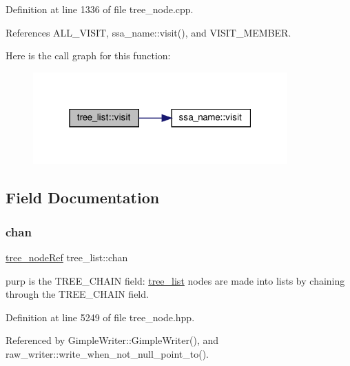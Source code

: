 Definition at line 1336 of file tree\+\_\+node.\+cpp.



References A\+L\+L\+\_\+\+V\+I\+S\+IT, ssa\+\_\+name\+::visit(), and V\+I\+S\+I\+T\+\_\+\+M\+E\+M\+B\+ER.

Here is the call graph for this function\+:
\nopagebreak
\begin{figure}[H]
\begin{center}
\leavevmode
\includegraphics[width=277pt]{d0/de6/structtree__list_aba63a94a601053b16420e7f757237b5d_cgraph}
\end{center}
\end{figure}


\subsection{Field Documentation}
\mbox{\label{structtree__list_aa5ce539dab8623b7ff811a2fbd1f0f25}} 
\subsubsection{\texorpdfstring{chan}{chan}}
{\footnotesize\ttfamily \hyperlink{tree__node_8hpp_a6ee377554d1c4871ad66a337eaa67fd5}{tree\+\_\+node\+Ref} tree\+\_\+list\+::chan}



purp is the T\+R\+E\+E\+\_\+\+C\+H\+A\+IN field\+: \hyperlink{structtree__list}{tree\+\_\+list} nodes are made into lists by chaining through the T\+R\+E\+E\+\_\+\+C\+H\+A\+IN field. 



Definition at line 5249 of file tree\+\_\+node.\+hpp.



Referenced by Gimple\+Writer\+::\+Gimple\+Writer(), and raw\+\_\+writer\+::write\+\_\+when\+\_\+not\+\_\+null\+\_\+point\+\_\+to().

\mbox{\label{structtree__list_a4c23410c67dcffd87d3269dc7f1af65c}} 
